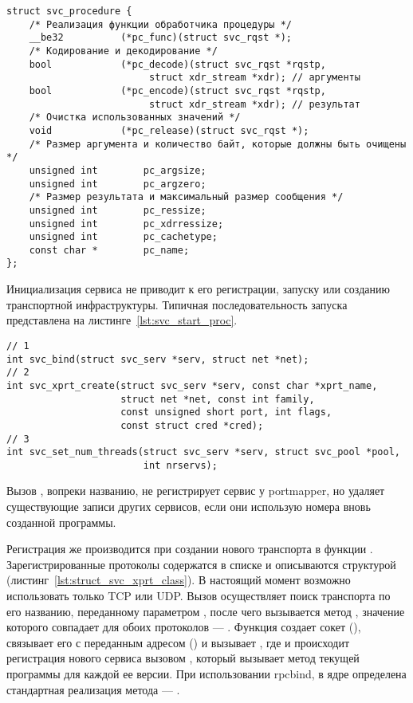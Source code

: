 \begin{lstlisting}[caption={Структура процедуры}, label={lst:struct_svc_procedure}]
struct svc_procedure {
    /* Реализация функции обработчика процедуры */
    __be32          (*pc_func)(struct svc_rqst *);
    /* Кодирование и декодирование */
    bool            (*pc_decode)(struct svc_rqst *rqstp,
                         struct xdr_stream *xdr); // аргументы
    bool            (*pc_encode)(struct svc_rqst *rqstp,
                         struct xdr_stream *xdr); // результат
    /* Очистка использованных значений */
    void            (*pc_release)(struct svc_rqst *);
    /* Размер аргумента и количество байт, которые должны быть очищены */
    unsigned int        pc_argsize;
    unsigned int        pc_argzero;
    /* Размер результата и максимальный размер сообщения */
    unsigned int        pc_ressize;
    unsigned int        pc_xdrressize;
    unsigned int        pc_cachetype;
    const char *        pc_name;
};
\end{lstlisting}

Инициализация сервиса не приводит к его регистрации, запуску или созданию
транспортной инфраструктуры. Типичная последовательность запуска представлена
на листинге~\ref{lst:svc_start_proc}.

\begin{lstlisting}[caption={Последовательность регистрации и запуска сервиса}, label={lst:svc_start_proc}]
// 1
int svc_bind(struct svc_serv *serv, struct net *net);
// 2
int svc_xprt_create(struct svc_serv *serv, const char *xprt_name,
                    struct net *net, const int family,
                    const unsigned short port, int flags,
                    const struct cred *cred);
// 3
int svc_set_num_threads(struct svc_serv *serv, struct svc_pool *pool,
                        int nrservs);
\end{lstlisting}

Вызов , вопреки названию, не регистрирует сервис у portmapper,
но удаляет существующие записи других сервисов, если они использую номера вновь
созданной программы.

Регистрация же производится при создании нового транспорта в функции
. Зарегистрированные протоколы содержатся в списке
 и описываются структурой 
(листинг~\ref{lst:struct_svc_xprt_class}). В настоящий момент возможно
использовать только TCP или UDP. Вызов  осуществляет
поиск транспорта по его названию, переданному параметром ,
после чего вызывается метод , значение которого совпадает для
обоих протоколов --- . Функция создает сокет
(), связывает его с переданным адресом
() и вызывает , где и происходит
регистрация нового сервиса вызовом , который вызывает метод
 текущей программы для каждой ее версии. При
использовании rpcbind, в ядре определена стандартная реализация метода ---
.

